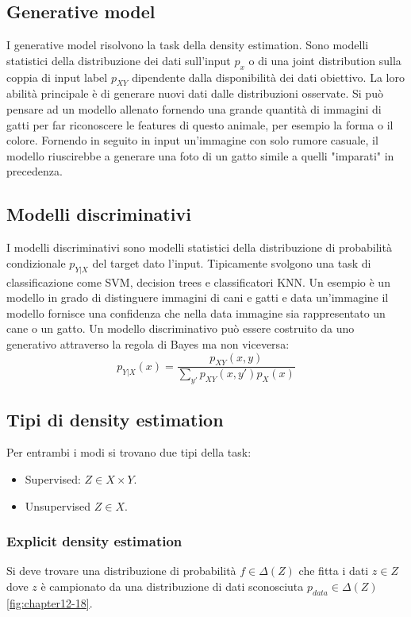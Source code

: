 	\subsection{Generative model}
	I generative model risolvono la task della density estimation.
	Sono modelli statistici della distribuzione dei dati sull'input $p_x$ o di una joint distribution sulla coppia di input label $p_{XY}$ dipendente dalla disponibilit\`a dei dati obiettivo.
	La loro abilit\`a principale \`e di generare nuovi dati dalle distribuzioni osservate. 
	Si può pensare ad un modello allenato fornendo una grande quantità di immagini di gatti per far riconoscere le features di questo animale, per esempio la forma o il colore.
	Fornendo in seguito in input un'immagine con solo rumore casuale, il modello riuscirebbe a generare una foto di un gatto simile a quelli "imparati" in precedenza.
	
	\subsection{Modelli discriminativi}
	I modelli discriminativi sono modelli statistici della distribuzione di probabilit\`a condizionale $p_{Y|X}$ del target dato l'input.
	Tipicamente svolgono una task di classificazione come SVM, decision trees e classificatori KNN. 
	Un esempio \`e un modello in grado di distinguere immagini di cani e gatti e data un'immagine il modello fornisce una confidenza che nella data immagine sia rappresentato un cane o un gatto.
	Un modello discriminativo pu\`o essere costruito da uno generativo attraverso la regola di Bayes ma non viceversa:
	$$p_{Y|X}(x) = \dfrac{p_{XY}(x,y)}{\sum\limits_{y'}p_{XY}(x,y')p_X(x)}$$
	
	\subsection{Tipi di density estimation}
	Per entrambi i modi si trovano due tipi della task:
	\begin{itemize}
		\item Supervised: $Z\in X\times Y$.
		\item Unsupervised $Z\in X$.
	\end{itemize}

		\subsubsection{Explicit density estimation}
		Si deve trovare una distribuzione di probabilit\`a $f\in \Delta(Z)$ che fitta i dati $z\in Z$ dove $z$ \`e campionato da una distribuzione di dati sconosciuta $p_{data}\in\Delta(Z)$ \ref{fig:chapter12-18}.
		

